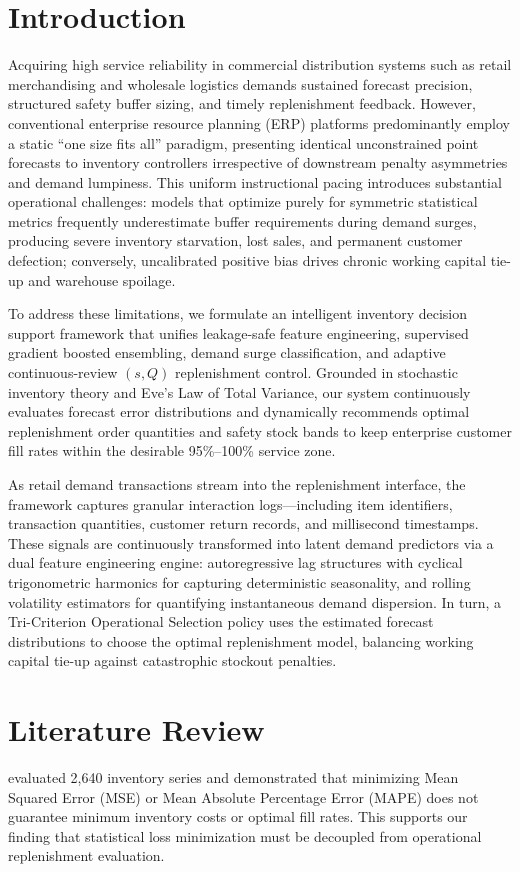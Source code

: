 \documentclass[11pt,a4paper]{article}
\begin{document}
\section{Introduction}
Acquiring high service reliability in commercial distribution systems such as retail merchandising and wholesale logistics demands sustained forecast precision, structured safety buffer sizing, and timely replenishment feedback. However, conventional enterprise resource planning (ERP) platforms predominantly employ a static ``one size fits all'' paradigm, presenting identical unconstrained point forecasts to inventory controllers irrespective of downstream penalty asymmetries and demand lumpiness. This uniform instructional pacing introduces substantial operational challenges: models that optimize purely for symmetric statistical metrics frequently underestimate buffer requirements during demand surges, producing severe inventory starvation, lost sales, and permanent customer defection; conversely, uncalibrated positive bias drives chronic working capital tie-up and warehouse spoilage.

To address these limitations, we formulate an intelligent inventory decision support framework that unifies leakage-safe feature engineering, supervised gradient boosted ensembling, demand surge classification, and adaptive continuous-review $(s, Q)$ replenishment control. Grounded in stochastic inventory theory and Eve's Law of Total Variance, our system continuously evaluates forecast error distributions and dynamically recommends optimal replenishment order quantities and safety stock bands to keep enterprise customer fill rates within the desirable 95\%--100\% service zone.

As retail demand transactions stream into the replenishment interface, the framework captures granular interaction logs---including item identifiers, transaction quantities, customer return records, and millisecond timestamps. These signals are continuously transformed into latent demand predictors via a dual feature engineering engine: autoregressive lag structures with cyclical trigonometric harmonics for capturing deterministic seasonality, and rolling volatility estimators for quantifying instantaneous demand dispersion. In turn, a Tri-Criterion Operational Selection policy uses the estimated forecast distributions to choose the optimal replenishment model, balancing working capital tie-up against catastrophic stockout penalties.

\section{Literature Review}
\cite{syntetos2005accuracy} evaluated 2,640 inventory series and demonstrated that minimizing Mean Squared Error (MSE) or Mean Absolute Percentage Error (MAPE) does not guarantee minimum inventory costs or optimal fill rates. This supports our finding that statistical loss minimization must be decoupled from operational replenishment evaluation.
\end{document}
